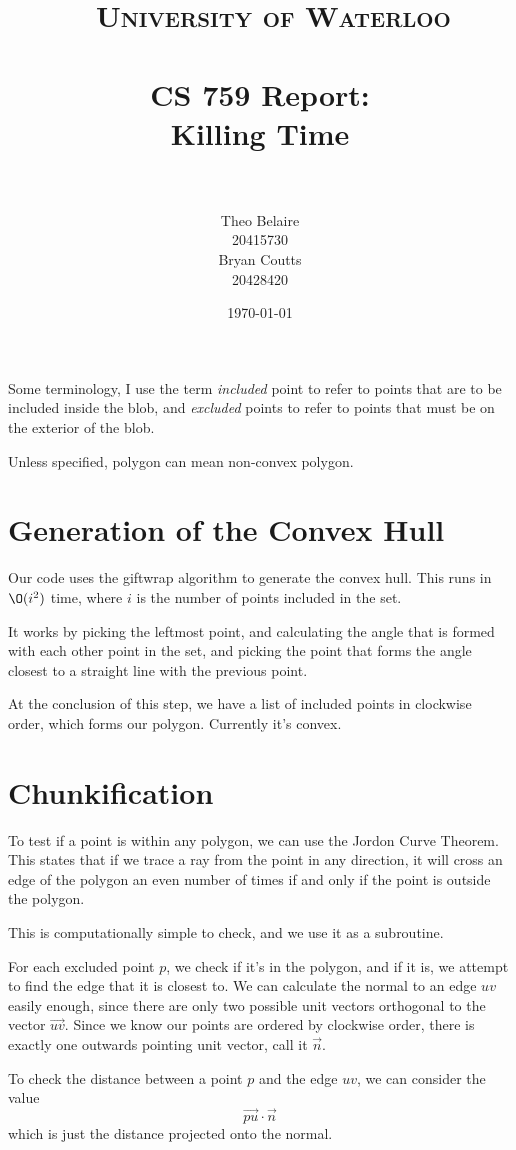 \documentclass[paper=a4, fontsize=11pt]{scrartcl} %
\title{\
    \normalfont\normalsize
    \textsc{University of Waterloo} \\ [25pt] %
    \horrule{0.5pt} \\[0.4cm] %
    \huge CS 759 Report:\\
    Killing Time \\
    \horrule{2pt} \\[0.5cm] %
}
\author{Theo Belaire \\ 20415730 \\ Bryan Coutts \\ 20428420} %
\date{\normalsize\today} %
\numberwithin{equation}{section} %
\numberwithin{figure}{section} %
\numberwithin{table}{section} %
\begin{document}
\maketitle %


Some terminology, I use the term \textit{included} point to refer to points
that are to be included inside the blob, and \textit{excluded} points to refer
to points that must be on the exterior of the blob.

Unless specified, polygon can mean non-convex polygon.


\section{Generation of the Convex Hull}
Our code uses the giftwrap algorithm to generate the convex hull.
This runs in $\O(i^2)$ time, where $i$ is the number of points included in the
set.

It works by picking the leftmost point, and calculating the angle that is
formed with each other point in the set, and picking the point that forms
the angle closest to a straight line with the previous point.

At the conclusion of this step, we have a list of included points in clockwise
order, which forms our polygon.  Currently it's convex.

\section{Chunkification}
To test if a point is within any polygon, we can use the Jordon Curve Theorem.
This states that if we trace a ray from the point in any direction, it
will cross an edge of the polygon an even number of times if and only if
the point is outside the polygon.

This is computationally simple to check, and we use it as a subroutine.

For each excluded point $p$, we check if it's in the polygon, and if it is,
we attempt to find the edge that it is closest to.
We can calculate the normal to an edge $uv$ easily enough, since there are
only two possible unit vectors orthogonal to the vector $\vec{uv}$.  Since
we know our points are ordered by clockwise order, there is exactly one outwards
pointing unit vector, call it $\vec{n}$.

To check the distance between a point $p$ and the edge 
$uv$, we can consider the value
\[ \vec{pu} \cdot \vec{n} \]
which is just the distance projected onto the normal.
\end{document}
